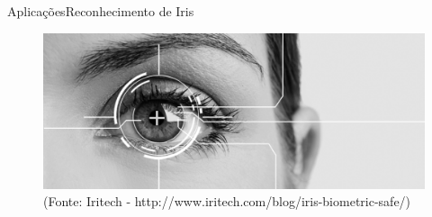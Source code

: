 \begin{frame}{Aplicações}{Reconhecimento de Iris}

\begin{figure}

    \centering
    \includegraphics[scale=.3]{img/iris_recognition.png}
    \caption{(Fonte: Iritech - http://www.iritech.com/blog/iris-biometric-safe/)}
    \label{fig:iris_recognition}
\end{figure}

\end{frame}

